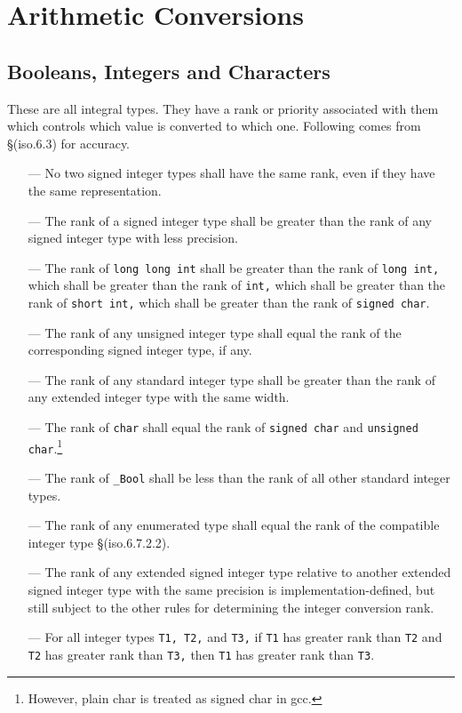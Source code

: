 \section{Arithmetic Conversions}
\subsection{Booleans, Integers and Characters}
These are all integral types. They have a rank or priority associated with them
which controls which value is converted to which one. Following comes from
\S(iso.6.3) for accuracy.

\begin{itemize}
\item[---] No two signed integer types shall have the same rank, even if they
  have the same representation.
\item[---] The rank of a signed integer type shall be greater than the rank of
  any signed integer type with less precision.
\item[---] The rank of \texttt{long long int} shall be greater than the rank of
  \texttt{long int,} which shall be greater than the rank of \texttt{int,}
  which shall be greater than the rank of \texttt{short int,} which shall be
  greater than the rank of \texttt{signed char}.
\item[---] The rank of any unsigned integer type shall equal the rank of the
  corresponding signed integer type, if any.
\item[---] The rank of any standard integer type shall be greater than the rank
  of any extended integer type with the same width.
\item[---] The rank of \texttt{char} shall equal the rank of \texttt{signed
    char} and \texttt{unsigned char}.\footnote{However, plain char is treated
    as signed char in gcc.}
\item[---] The rank of \texttt{\_Bool} shall be less than the rank of all other
  standard integer types. 
\item[---] The rank of any enumerated type shall equal the rank of the
  compatible integer type \S(iso.6.7.2.2).
\item[---]The rank of any extended signed integer type relative to another
  extended signed integer type with the same precision is
  implementation-defined, but still subject to the other rules for determining
  the integer conversion rank.
\item[---] For all integer types \texttt{T1, T2,} and \texttt{T3,} if
  \texttt{T1} has greater rank than \texttt{T2} and \texttt{T2} has greater
  rank than \texttt{T3,} then \texttt{T1} has greater rank than \texttt{T3}.
\end{itemize}

